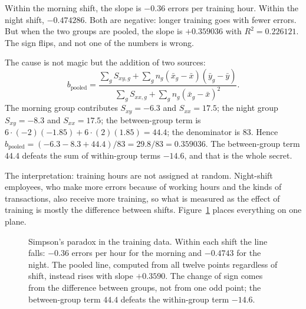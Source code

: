 Within the morning shift, the slope is $-0.36$ errors per training hour. Within the night shift,
$-0.474286$. Both are negative: longer training goes with fewer errors. But when the two groups
are pooled, the slope is $+0.359036$ with $R^2=0.226121$. The sign flips, and not one of the
numbers is wrong.

The cause is not magic but the addition of two sources:
\[
b_{\text{pooled}}=\frac{\sum_g S_{xy,g}+\sum_g n_g(\bar x_g-\bar x)(\bar y_g-\bar y)}
{\sum_g S_{xx,g}+\sum_g n_g(\bar x_g-\bar x)^2}.
\]
The morning group contributes $S_{xy}=-6.3$ and $S_{xx}=17.5$; the night group $S_{xy}=-8.3$ and
$S_{xx}=17.5$; the between-group term is $6\cdot(-2)(-1.85)+6\cdot(2)(1.85)=44.4$; the
denominator is $83$. Hence
$b_{\text{pooled}}=(-6.3-8.3+44.4)/83=29.8/83=0.359036$. The between-group term $44.4$ defeats
the sum of within-group terms $-14.6$, and that is the whole secret.

The interpretation: training hours are not assigned at random. Night-shift employees, who make
more errors because of working hours and the kinds of transactions, also receive more training,
so what is measured as the effect of training is mostly the difference between shifts.
Figure~\ref{fig:simpson} places everything on one plane.

\begin{figure}[htbp]
\centering
{}
\caption{Simpson's paradox in the training data. Within each shift the line falls: $-0.36$ errors
per hour for the morning and $-0.4743$ for the night. The pooled line, computed from all twelve
points regardless of shift, instead rises with slope $+0.3590$. The change of sign comes from
the difference between groups, not from one odd point; the between-group term $44.4$ defeats the
within-group term $-14.6$.}
\label{fig:simpson}
\end{figure}

